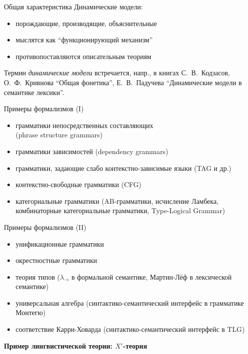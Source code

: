 \documentclass{beamer}
\begin{document}
\begin{frame}{Общая характеристика}
Динамические модели:\\
\medskip
\begin{itemize}
	\item порождающие, производящие, объяснительные
	\item мыслятся как ``функционирующий механизм''
	\item противопоставляются описательным теориям
\end{itemize}
\medskip
{\small Термин \textit{динамические модели} встречается, напр., в книгах С.~В.~Кодзасов, О.~Ф.~Кривнова ``Общая фонетика'', Е.~В.~Падучева ``Динамические модели в семантике лексики''.}
\end{frame}

\begin{frame}{Примеры формализмов (I)}
\begin{itemize}
	\item грамматики непосредственных составляющих\\(phrase structure grammars)
	\item грамматики зависимостей (dependency grammars)
	\item грамматики, задающие слабо контекстно-зависимые языки (TAG и др.)
	\item контекстно-свободные грамматики (CFG)
	\item категориальные грамматики (AB-грамматики, исчисление Ламбека, комбинаторные категориальные грамматики, Type-Logical Grammar)
\end{itemize}
\end{frame}

\begin{frame}{Примеры формализмов (II)}
\begin{itemize}
	\item унификационные грамматики
	\item окрестностные грамматики
	\item теория типов ($\lambda_\to$ в формальной семантике, Мартин-Лёф в лексической семантике)
	\item универсальная алгебра (синтактико-семантический интерфейс в грамматике Монтегю)
	\item соответствие Карри-Ховарда (синтактико-семантический интерфейс в TLG)
\end{itemize}
\end{frame}

\begin{frame}{}
\begin{center}
	\textbf{Пример лингвистической теории: $X'$-теория}
\end{center}
\end{frame}
\end{document}

